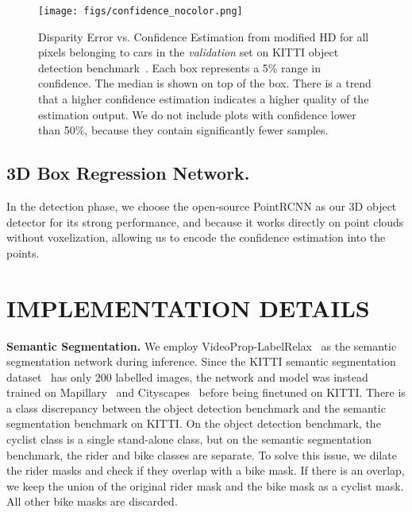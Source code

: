\documentclass[letterpaper, 10 pt, conference]{ieeeconf}
\begin{document}
\begin{figure}[ht] 
	\begin{center}
		\texttt{[image: figs/confidence\_nocolor.png]}
	\end{center}
		\caption{Disparity Error vs. Confidence Estimation from modified HD for all pixels belonging to cars in the \emph{validation} set on KITTI object detection benchmark~\cite{geiger2012we}. Each box represents a 5\% range in confidence. The median is shown on top of the box. There is a trend that a higher confidence estimation indicates a higher quality of the estimation output. We do not include plots with confidence lower than 50\%, because they contain significantly fewer samples.}
		\label{fig:confidence}
\end{figure}

\subsection{3D Box Regression Network.}
In the detection phase, we choose the open-source PointRCNN as our 3D object detector for its strong performance, and because it works directly on point clouds without voxelization, allowing us to encode the confidence estimation into the points.

\section{IMPLEMENTATION DETAILS}\label{metric}
\noindent \textbf{Semantic Segmentation.}
We employ VideoProp-LabelRelax~\cite{zhu2019improving} as the semantic segmentation network during inference. Since the KITTI semantic segmentation dataset~\cite{geiger2012we} has only 200 labelled images, the network and model was instead trained on Mapillary~\cite{neuhold2017mapillary} and Cityscapes~\cite{cordts2015cityscapes} before being finetuned on KITTI. There is a class discrepancy between the object detection benchmark and the semantic segmentation benchmark on KITTI. On the object detection benchmark, the cyclist class is a single stand-alone class, but on the semantic segmentation benchmark, the rider and bike classes are separate. To solve this issue, we dilate the rider masks and check if they overlap with a bike mask. If there is an overlap, we keep the union of the original rider mask and the bike mask as a cyclist mask. All other bike masks are discarded. \\
\end{document}
